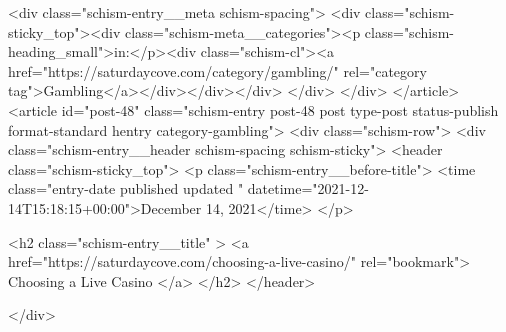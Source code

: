 {		<div class="schism-entry__meta schism-spacing">			<div class="schism-sticky_top"><div class="schism-meta__categories"><p class="schism-heading_small">in:</p><div class="schism-cl"><a href="https://saturdaycove.com/category/gambling/" rel="category tag">Gambling</a></div></div></div>		</div>
	</div>
</article>
<article id="post-48" class="schism-entry post-48 post type-post status-publish format-standard hentry category-gambling">
	<div class="schism-row">		<div class="schism-entry__header schism-spacing schism-sticky">			<header class="schism-sticky_top">				<p class="schism-entry__before-title">
					<time class="entry-date published updated " datetime="2021-12-14T15:18:15+00:00">December 14, 2021</time>				</p>

				<h2 class="schism-entry__title" >
					<a href="https://saturdaycove.com/choosing-a-live-casino/" rel="bookmark">
						Choosing a Live Casino					</a>
				</h2>
			</header>

					</div>

}
